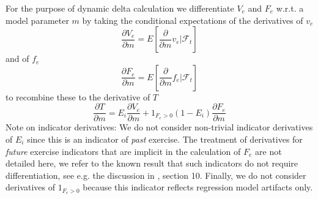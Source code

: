\documentclass[11pt,a4paper,oneside]{article}
\begin{document}
For the purpose of dynamic delta calculation we differentiate $V_e$ and $F_e$ w.r.t. a model parameter $m$
by taking the conditional expectations of the derivatives of $v_e$
\begin{equation}\label{aad:calc4}
\frac{\partial V_e}{\partial m} = E \left[ \frac{\partial}{\partial m} v_e \bigg| \mathcal{F}_t \right]
\end{equation}
and of $f_e$
\begin{equation}\label{aad:calc5}
\frac{\partial F_e}{\partial m} = E \left[ \frac{\partial}{\partial m} f_e \bigg| \mathcal{F}_t \right]
\end{equation}
to recombine these to the derivative of $T$
\begin{equation}\label{aad:calc6}
\frac{\partial T}{\partial m} = E_i \frac{\partial V_e}{\partial m} + 1_{F_e > 0} (1 - E_i) \frac{\partial F_e}{\partial m}
\end{equation}
Note on indicator derivatives: We do not consider non-trivial indicator derivatives of $E_i$ since this is an indicator
of {\em past} exercise. The treatment of derivatives for {\em future} exercise indicators that are implicit in the
calculation of $F_e$ are not detailed here, we refer to the known result that such indicators do not require
differentiation, see e.g. the discussion in \cite{piterbarg_deltas_callable_libor_exotics}, section 10. Finally, we do
not consider derivatives of $1_{F_e > 0}$ because this indicator reflects regression model artifacts only.

\end{document}
